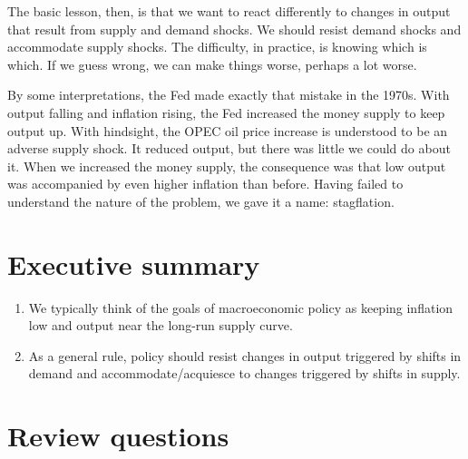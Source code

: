 The basic lesson, then, is that we want to react differently to
changes in output that result from supply and demand shocks.
We should resist demand shocks and accommodate supply shocks.
The difficulty, in practice, is knowing which is which.
If we guess wrong, we can make things worse, perhaps a lot worse.

By some interpretations, the Fed made exactly that mistake in the 1970s.
With output falling and inflation rising, the Fed increased the money
supply to keep output up.
With hindsight, the OPEC oil price increase is understood to be an
adverse supply shock.
It reduced output, but there was little we could do about it.
When we increased the money supply, the consequence was that low
output was accompanied by even higher inflation than before.
Having failed to understand the nature of the problem,
we gave it a name:  stagflation.


\section*{Executive summary}

\setlength{\leftmargini}{.5\oldleftmargini}
\begin{enumerate}
\item We typically think of the goals of macroeconomic
policy as keeping inflation low and output near the long-run
supply curve.

\item As a general rule, policy should resist changes in output
triggered by shifts in demand and accommodate/acquiesce
to changes triggered by shifts in supply.
\end{enumerate}
\setlength{\leftmargini}{\oldleftmargini}

\section*{Review questions}

